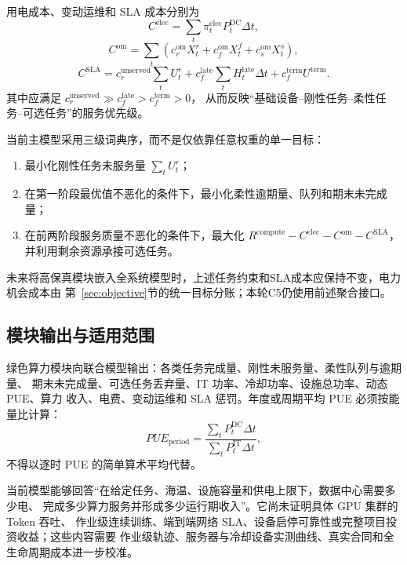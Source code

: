 用电成本、变动运维和 SLA 成本分别为
\begin{equation}
C^{\mathrm{elec}}
=\sum_t\pi_t^{\mathrm{elec}}P_t^{\mathrm{DC}}\Delta t,
\end{equation}
\begin{equation}
C^{\mathrm{om}}
=\sum_t\left(c_r^{\mathrm{om}}X_t^r+c_f^{\mathrm{om}}X_t^f
+c_s^{\mathrm{om}}X_t^s\right),
\end{equation}
\begin{equation}
C^{\mathrm{SLA}}
=c_r^{\mathrm{unserved}}\sum_tU_t^r
+c_f^{\mathrm{late}}\sum_tH_t^{\mathrm{late}}\Delta t
+c_f^{\mathrm{term}}U^{\mathrm{term}}.
\label{eq:dc-sla-cost}
\end{equation}
其中应满足
$c_r^{\mathrm{unserved}}\gg c_f^{\mathrm{late}}>c_f^{\mathrm{term}}>0$，
从而反映“基础设备--刚性任务--柔性任务--可选任务”的服务优先级。

当前主模型采用三级词典序，而不是仅依靠任意权重的单一目标：
\begin{enumerate}[label=(\arabic*)]
\item 最小化刚性任务未服务量 $\sum_tU_t^r$；
\item 在第一阶段最优值不恶化的条件下，最小化柔性逾期量、队列和期末未完成量；
\item 在前两阶段服务质量不恶化的条件下，最大化
$R^{\mathrm{compute}}-C^{\mathrm{elec}}-C^{\mathrm{om}}-C^{\mathrm{SLA}}$，
并利用剩余资源承接可选任务。
\end{enumerate}
未来将高保真模块嵌入全系统模型时，上述任务约束和SLA成本应保持不变，电力机会成本由
第~\ref{sec:objective}节的统一目标分账；本轮C5仍使用前述聚合接口。

\subsection{模块输出与适用范围}

绿色算力模块向联合模型输出：各类任务完成量、刚性未服务量、柔性队列与逾期量、
期末未完成量、可选任务丢弃量、IT 功率、冷却功率、设施总功率、动态 PUE、算力
收入、电费、变动运维和 SLA 惩罚。年度或周期平均 PUE 必须按能量比计算：
\begin{equation}
PUE_{\mathrm{period}}
=\frac{\sum_tP_t^{\mathrm{DC}}\Delta t}
{\sum_tP_t^{\mathrm{IT}}\Delta t},
\label{eq:dc-period-pue}
\end{equation}
不得以逐时 PUE 的简单算术平均代替。

当前模型能够回答“在给定任务、海温、设施容量和供电上限下，数据中心需要多少电、
完成多少算力服务并形成多少运行期收入”。它尚未证明具体 GPU 集群的 Token 吞吐、
作业级连续训练、端到端网络 SLA、设备启停可靠性或完整项目投资收益；这些内容需要
作业级轨迹、服务器与冷却设备实测曲线、真实合同和全生命周期成本进一步校准。
